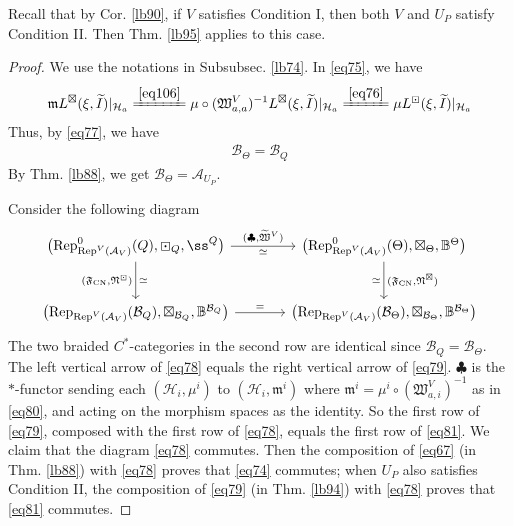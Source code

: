 \documentclass[11pt,b5paper,notitlepage]{article}
\theoremstyle{definition}
\theoremstyle{plain}
\newcommand{\fk}{\mathfrak}
\newcommand{\mc}{\mathcal}
\newcommand{\wtd}{\widetilde}
\newcommand{\Rep}{\mathrm{Rep}}
\newcommand{\mk}{\mathfrak m}
\newcommand{\CN}{{\scriptscriptstyle \mathrm{CN}}}
\numberwithin{equation}{section}
\begin{document}
Recall that by Cor. \ref{lb90}, if $V$ satisfies Condition I, then both $V$ and $U_P$ satisfy Condition II. Then Thm. \ref{lb95} applies to this case.

\begin{proof}
We use the notations in Subsubsec. \ref{lb74}. In \eqref{eq75}, we have
\begin{align}\label{eq83}
\mk L^\boxtimes(\xi,\wtd I)|_{\mc H_a}\xlongequal{\eqref{eq106}}\mu\circ(\fk W^V_{a,a})^{-1}L^\boxtimes(\xi,\wtd I)|_{\mc H_a}\xlongequal{\eqref{eq76}}\mu L^\boxdot(\xi,\wtd I)|_{\mc H_a}
\end{align}
Thus, by \eqref{eq77}, we have
\begin{align*}
\mc B_\Theta=\mc B_Q
\end{align*}
By Thm. \ref{lb88}, we get $\mc B_\Theta=\mc A_{U_P}$. 

Consider the following diagram
\begin{equation}\label{eq78}
\begin{tikzcd}[row sep=large,column sep=large]
\big(\Rep^0_{\Rep^V(\mc A_V)}(Q),\boxdot_Q,\ss^Q \big) \arrow[r,"{(\clubsuit,\wtd{\fk W}^V)}","\simeq"'] \arrow[d,"{(\fk F_\CN,\fk N^\boxdot)}"',"\simeq"] & \big(\Rep^0_{\Rep^V(\mc A_V)}(\Theta),\boxtimes_\Theta,\mathbb B^\Theta \big)\arrow[d,"{(\fk F_\CN,\fk N^\boxtimes)}","\simeq"'] \\
\big(\Rep_{\Rep^V(\mc A_V)}(\mc B_Q),\boxtimes_{\mc B_Q},\mathbb B^{\mc B_Q} \big)\arrow[r,"="]           & \big(\Rep_{\Rep^V(\mc A_V)}(\mc B_\Theta),\boxtimes_{\mc B_\Theta},\mathbb B^{\mc B_\Theta} \big)         
\end{tikzcd}
\end{equation}
The two braided $C^*$-categories in the second row are identical since $\mc B_Q=\mc B_\Theta$. The left vertical arrow of \eqref{eq78} equals the right vertical arrow of \eqref{eq79}. $\clubsuit$ is the $*$-functor sending each $(\mc H_i,\mu^i)$ to $(\mc H_i,\mk^i)$ where $\mk^i=\mu^i\circ(\fk W_{a,i}^V)^{-1}$ as in \eqref{eq80}, and acting on the morphism spaces as the identity. So the first row of \eqref{eq79}, composed with the first row of \eqref{eq78}, equals the first row of \eqref{eq81}. We claim that the diagram \eqref{eq78} commutes. Then the composition of \eqref{eq67} (in Thm. \ref{lb88}) with \eqref{eq78} proves that \eqref{eq74} commutes; when $U_P$ also satisfies Condition II, the composition of \eqref{eq79} (in Thm. \ref{lb94}) with \eqref{eq78} proves that \eqref{eq81} commutes.



\end{proof}
\end{document}
